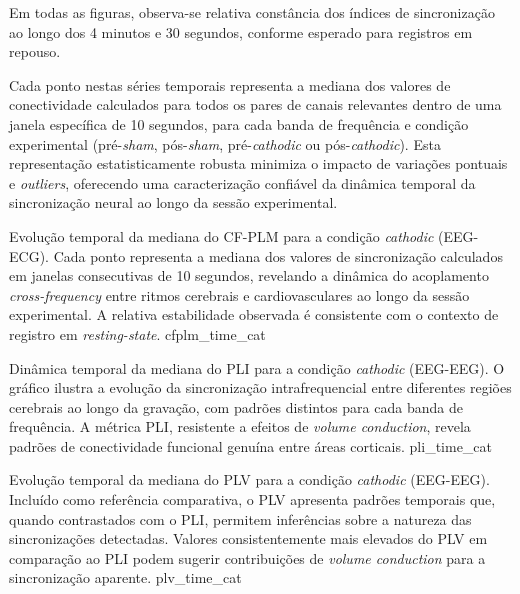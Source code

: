 Em todas as figuras, observa-se relativa constância dos índices de sincronização ao longo dos 4 minutos e 30 segundos, conforme esperado para registros em repouso.

Cada ponto nestas séries temporais representa a mediana dos valores de conectividade calculados para todos os pares de canais relevantes dentro de uma janela específica de 10 segundos, para cada banda de frequência e condição experimental (pré-\textit{sham}, pós-\textit{sham}, pré-\textit{cathodic} ou pós-\textit{cathodic}). Esta representação estatisticamente robusta minimiza o impacto de variações pontuais e \textit{outliers}, oferecendo uma caracterização confiável da dinâmica temporal da sincronização neural ao longo da sessão experimental.

{Evolução temporal da mediana do CF-PLM para a condição \textit{cathodic} (EEG-ECG). Cada ponto representa a mediana dos valores de sincronização calculados em janelas consecutivas de 10 segundos, revelando a dinâmica do acoplamento \textit{cross-frequency} entre ritmos cerebrais e cardiovasculares ao longo da sessão experimental. A relativa estabilidade observada é consistente com o contexto de registro em \textit{resting-state}.}
{cfplm_time_cat}

{Dinâmica temporal da mediana do PLI para a condição \textit{cathodic} (EEG-EEG). O gráfico ilustra a evolução da sincronização intrafrequencial entre diferentes regiões cerebrais ao longo da gravação, com padrões distintos para cada banda de frequência. A métrica PLI, resistente a efeitos de \textit{volume conduction}, revela padrões de conectividade funcional genuína entre áreas corticais.}
{pli_time_cat}

{Evolução temporal da mediana do PLV para a condição \textit{cathodic} (EEG-EEG). Incluído como referência comparativa, o PLV apresenta padrões temporais que, quando contrastados com o PLI, permitem inferências sobre a natureza das sincronizações detectadas. Valores consistentemente mais elevados do PLV em comparação ao PLI podem sugerir contribuições de \textit{volume conduction} para a sincronização aparente.}
{plv_time_cat}